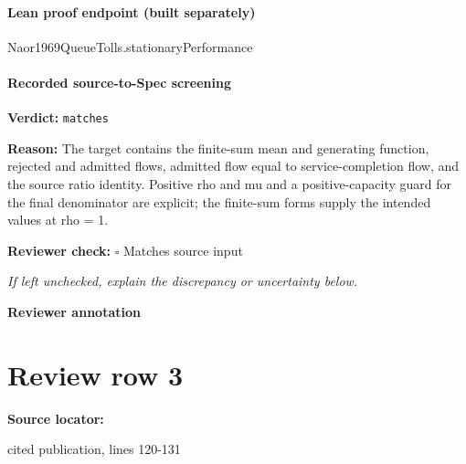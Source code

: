 \documentclass[10pt]{article}
\newcommand{\reviewerbox}{%
  \par\noindent\fbox{\parbox{0.96\linewidth}{\rule{0pt}{0.38in}}}\par
}
\newcommand{\reviewmatch}[1]{%
  \par\noindent\textbf{Reviewer check:} $\square$\; #1\par
  \noindent\emph{If left unchecked, explain the discrepancy or uncertainty below.}\par
}
\begin{document}
\paragraph{Lean proof endpoint (built separately)}\begin{ReviewVerbatim}
Naor1969QueueTolls.stationaryPerformance
\end{ReviewVerbatim}

\paragraph{Recorded source-to-Spec screening}
\textbf{Verdict:} \texttt{matches}
\\
{\raggedright
\textbf{Reason:} The target contains the finite-\allowbreak{}sum mean and generating function, rejected and admitted flows, admitted flow equal to service-\allowbreak{}completion flow, and the source ratio identity.\allowbreak{} Positive rho and mu and a positive-\allowbreak{}capacity guard for the final denominator are explicit;\allowbreak{} the finite-\allowbreak{}sum forms supply the intended values at rho = 1.\allowbreak{}
\par}
\reviewmatch{Matches source input}
\noindent\textbf{Reviewer annotation}\par
\reviewerbox
\clearpage
\hypertarget{source-claim-2246e911945a4738}{}
\section*{Review row 3}
\textbf{Source locator:} {\footnotesize\raggedright cited publication, lines 120-\allowbreak{}131\par}
\end{document}
